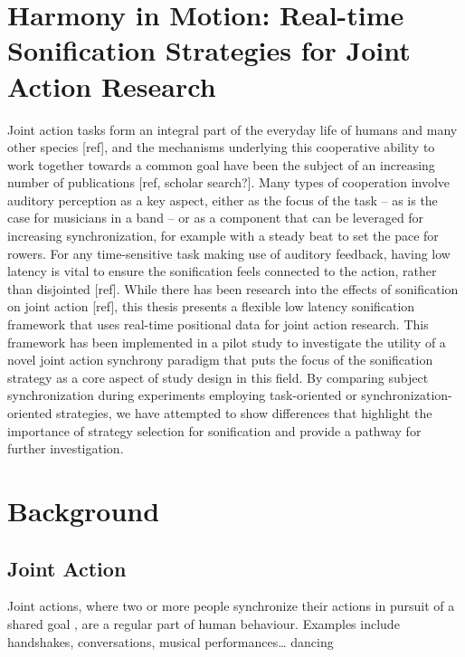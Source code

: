 \documentclass[10pt,a4paper,onecolumn]{article}
\begin{document}
\hypertarget{harmony-in-motion-real-time-sonification-strategies-for-joint-action-research}{%
\section{Harmony in Motion: Real-time Sonification Strategies for Joint Action Research}\label{harmony-in-motion-real-time-sonification-strategies-for-joint-action-research}}

Joint action tasks form an integral part of the everyday life of humans and many other species {[}ref{]},
and the mechanisms underlying this cooperative ability to work together towards a common goal have been
the subject of an increasing number of publications {[}ref, scholar search?{]}. Many types of cooperation
involve auditory perception as a key aspect, either as the focus of the task -- as is the case for
musicians in a band -- or as a component that can be leveraged for increasing synchronization,
for example with a steady beat to set the pace for rowers. For any time-sensitive task making
use of auditory feedback, having low latency is vital to ensure the sonification feels connected
to the action, rather than disjointed {[}ref{]}. While there has been research into the effects of
sonification on joint action {[}ref{]}, this thesis presents a flexible low latency sonification
framework that uses real-time positional data for joint action research. This framework has been
implemented in a pilot study to investigate the utility of a novel joint action synchrony paradigm
that puts the focus of the sonification strategy as a core aspect of study design in this field. By
comparing subject synchronization during experiments employing task-oriented or synchronization-oriented
strategies, we have attempted to show differences that highlight the importance of strategy selection
for sonification and provide a pathway for further investigation.

\hypertarget{background}{%
\section{Background}\label{background}}

\hypertarget{joint-action}{%
\subsection{Joint Action}\label{joint-action}}

Joint actions, where two or more people synchronize their actions in pursuit of a shared goal \autocite{knoblichPsychologicalResearchJoint2011}, are a regular part of human behaviour. Examples include handshakes, conversations, musical performances\ldots{} dancing
\end{document}
